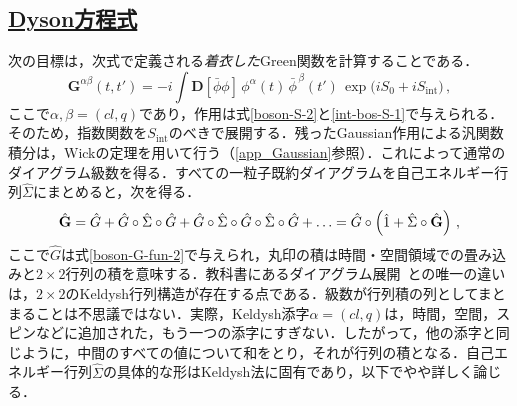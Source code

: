 \documentclass[a4paper,11pt]{ltjsarticle}
\newcommand{\subsectionlink}[1]{\subsection[#1]{\hyperlink{toc}{#1}}}
\def\D{\mathbf{D}}
\begin{document}
\subsectionlink{Dyson方程式}\label{sec_int_bos-3}


次の目標は，次式で定義される\emph{着衣した}Green関数を計算することである．
\begin{equation}\label{int-bos-G-dressed}
\mathbf{G}^{\alpha\beta}(t,t')=-i\int\D[\bar{\phi}\phi]
\,\phi^\alpha(t)\,\bar{\phi}^{\,\beta}(t')\,
\exp\big(iS_0+iS_{\mathrm{int}}\big)\, ,
\end{equation}ここで$\alpha,\beta=(cl,q)$であり，作用は式\eqref{boson-S-2}と\eqref{int-bos-S-1}で与えられる．そのため，指数関数を$S_{\mathrm{int}}$のべきで展開する．残ったGaussian作用による汎関数積分は，Wickの定理を用いて行う（\ref{app_Gaussian}参照）．これによって通常のダイアグラム級数を得る．すべての一粒子既約ダイアグラムを自己エネルギー行列$\hat{\Sigma}$にまとめると，次を得る．
\begin{equation}\label{int-bos-G-expansion}
\hat{{\bf G}}=\hat{G}+\hat{G}\circ\hat{\Sigma}\circ
\hat{G}+\hat{G}\circ\hat{\Sigma}\circ \hat{G}\circ\hat{\Sigma}\circ
\hat{G} +\ldots= \hat{G}\circ\left(\hat 1+\hat{\Sigma}\circ\hat{{\bf
G}}\right) \, ,
\end{equation}ここで$\hat G$は式\eqref{boson-G-fun-2}で与えられ，丸印の積は時間・空間領域での畳み込みと$2\times 2$行列の積を意味する．教科書にあるダイアグラム展開~\cite{Mahan,AGD,Negele:1988vy}との唯一の違いは，$2\times 2$のKeldysh行列構造が存在する点である．級数が行列積の列としてまとまることは不思議ではない．実際，Keldysh添字$\alpha=(cl,q)$は，時間，空間，スピンなどに追加された，もう一つの添字にすぎない．したがって，他の添字と同じように，中間のすべての値について和をとり，それが行列の積となる．自己エネルギー行列$\hat{\Sigma}$の具体的な形はKeldysh法に固有であり，以下でやや詳しく論じる．
\end{document}
